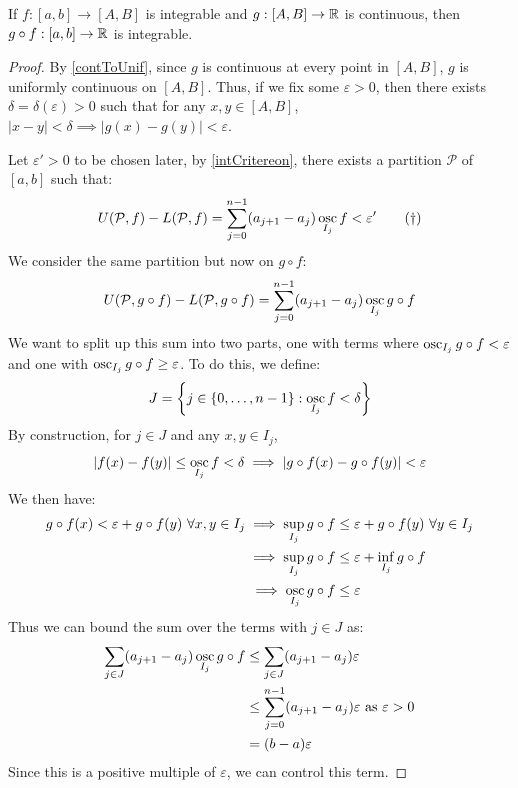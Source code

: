 \documentclass[../main.tex]{subfiles}
\begin{document}
\begin{theorem}
  If $f: [a, b] \to [A, B]$ is integrable and $g: [A, B] \to \mathbb{R}$ is continuous, then $g \circ f: [a, b] \to \mathbb{R}$ is integrable. \label{compInt}
\end{theorem}
\begin{proof}
  By \cref{contToUnif}, since $g$ is continuous at every point in $[A, B]$, $g$ is uniformly continuous on $[A, B]$.
  Thus, if we fix some $\varepsilon > 0$, then there exists $\delta = \delta(\varepsilon) > 0$ such that for any $x, y \in [A, B]$, $|x - y| < \delta \implies |g(x) - g(y)| < \varepsilon$.

  Let $\varepsilon' > 0$ to be chosen later, by \cref{intCritereon}, there exists a partition $\mathcal{P}$ of $[a, b]$ such that:
  \begin{equation}
    U(\mathcal{P}, f) - L(\mathcal{P}, f) = \sum_{j = 0}^{n - 1} (a_{j + 1} - a_{j}) \operatorname*{osc}_{I_j} f < \varepsilon' \label{epsBound} \tag{\dag}
  \end{equation}
  We consider the same partition but now on $g \circ f$:
  \begin{align*}
    U(\mathcal{P}, g \circ f) - L(\mathcal{P}, g \circ f) = \sum_{j = 0}^{n - 1} (a_{j + 1} - a_j) \operatorname*{osc}_{I_j} g \circ f
  \end{align*}
  We want to split up this sum into two parts, one with terms where $\operatorname*{osc}_{I_j} g \circ f < \varepsilon$ and one with $\operatorname*{osc}_{I_j} g \circ f \geq \varepsilon$.
  To do this, we define:
  \[
    J = \left\{j \in \{0, \ldots, n-1\}: \operatorname*{osc}_{I_j} f < \delta\right\}
  \]
  By construction, for $j \in J$ and any $x , y \in I_j$,
  \[
    |f(x) - f(y)| \leq \operatorname*{osc}_{I_j} f < \delta \implies |g \circ f(x) - g \circ f(y)| < \varepsilon
  \]
  We then have:
  \begin{align*}
    g \circ f(x) < \varepsilon + g \circ f(y)\ \forall x, y \in I_j \implies \sup_{I_j} g \circ f &\leq \varepsilon + g \circ f (y)\ \forall y \in I_j \\
    \implies \sup_{I_j} g \circ f &\leq \varepsilon + \inf_{I_j} g \circ f \\
    \implies \osc_{I_j} g \circ f &\leq \varepsilon
  \end{align*}
  Thus we can bound the sum over the terms with $j \in J$ as:
  \begin{align*}
    \sum_{j \in J} (a_{j + 1} - a_j) \operatorname*{osc}_{I_j} g \circ f &\leq \sum_{j \in J} (a_{j + 1} - a_j) \varepsilon \\
                                                          &\leq \sum_{j = 0}^{n - 1} (a_{j + 1} - a_j) \varepsilon \text{ as $\varepsilon > 0$} \\
                                                          &= (b - a)\varepsilon
  \end{align*}
  Since this is a positive multiple of $\varepsilon$, we can control this term.


\end{proof}
\end{document}
